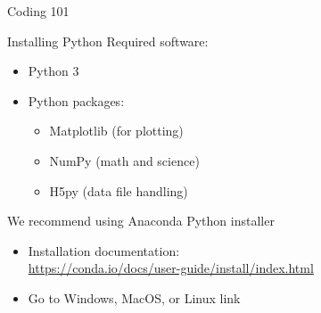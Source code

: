 \documentclass[xcolor=dvipsnames]{beamer}
\begin{document}
\begin{frame}
    \begin{center}
        \Large{Coding 101}
    \end{center}
\end{frame}
\begin{frame}{Installing Python}
  Required software:
  \begin{itemize}
    \item Python 3
    \item Python packages:
    \begin{itemize}
      \item Matplotlib (for plotting)
      \item NumPy (math and science)
      \item H5py (data file handling)
    \end{itemize}
  \end{itemize}
  We recommend using Anaconda Python installer
  \begin{itemize}
    \item Installation documentation: \\
    \url{https://conda.io/docs/user-guide/install/index.html}
    \item Go to Windows, MacOS, or Linux link
  \end{itemize}
\end{frame}
\begin{frame}
\end{frame}
\end{document}

